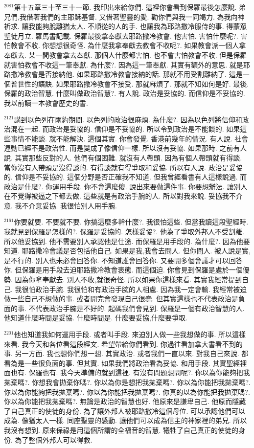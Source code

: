\documentclass{book}
\begin{document}
$^{2081}$第十五章三十至三十一節.
我印出來給你們.
這裡你會看到保羅最後怎麼說.
弟兄們,我借著我們的主耶穌基督.
又借著聖靈的愛.
勸你們與我一同竭力.
為我向神祈求.
讓我能夠脫離猶太人.
不順從的人的手.
也讓我為耶路撒冷服侍的事.
得蒙眾聖徒月立.
羅馬書記載.
保羅最後拿奉獻去耶路撒冷教會.
他害怕.
害怕什麼呢?.
害怕教會不收.
你想想很奇怪.
為什麼我拿奉獻去教會不收呢?.
如果教會派一個人拿奉獻去.
某一間教會拿去奉獻.
那個人什麼都害怕.
也不會害怕教會不收.
但是保羅就害怕教會不收這一筆奉獻.
為什麼?.
因為這一筆奉獻.
其實有額外的意思.
就是耶路撒冷教會是否接納他.
如果耶路撒冷教會接納的話.
那就不用受割離納了.
這是一個普世性的語訣.
如果耶路撒冷教會不接受.
那就麻煩了.
那就不知如何是好.
最後.
保羅的政治智慧.
什麼叫做政治智慧?.
有人說.
政治是妥協的.
而信仰是不妥協的.
我以前讀一本教會歷史的書.

$^{2121}$講到以色列在兩約期間.
以色列的政治很麻煩.
為什麼?.
因為以色列將信仰和政治混在一起.
而政治是妥協的.
信仰是不妥協的.
所以令到政治是不能談的.
如果這些事情不能談.
就不能解決.
這個其實.
你會發覺.
香港前幾年的情況.
有人說.
社會運動已經不是政治性.
而是變成了像信仰一樣.
所以沒有妥協.
如果那時.
之前有人說.
其實那些反對的人.
他們有個困難.
就沒有人帶頭.
因為有個人帶頭就有得談.
當你沒有人帶頭是沒得談的.
有得談就有得爭取和妥協.
所以有人說.
政治是妥協的.
信仰是不妥協的.
這個分野是否正確我不知道.
但我曾經看書有人這樣說過.
而政治是什麼?.
你運用手段.
你不會這麼傻.
說出來要做這件事.
你要想辦法.
讓別人在不覺得被逼之下都去做.
這些就是有政治手腕的人.
所以對我來說.
妥協我不介意.
我不介意妥協.
我很怕別人用手腕.

$^{2161}$你要就要.
不要就不要.
你搞這麼多幹什麼?.
我很怕這些.
但當我讀這段聖經時.
我就見到保羅是怎樣的?.
保羅是妥協的.
怎樣妥協?.
他為了爭取外邦人不受割離.
所以他妥協到.
他不需要別人承認他是仕途.
而保羅是用手段的.
為什麼?.
因為他要知道.
耶路撒冷會議是否包括他自己.
如果是我,我會去問人.
但你問人.
被人說是實,是不行的.
別人也未必會回答你.
不知道誰會回答你.
又要開多個會議才可以回答你.
但保羅是用手段去迫耶路撒冷教會表態.
而這個迫.
你會見到保羅是處於一個優勢.
因為你拿奉獻去.
別人不收,就很奇怪.
所以如果你這樣來看.
其實我經常提到自己.
我很怕政治手腕.
我很怕和有政治手腕的人相處.
因為我一定會輸.
我經常被迫做一些自己不想做的事.
或者開完會發現自己很蠢.
但其實這樣也不代表政治是負面的事.
不代表政治手腕是不好的.
起碼我們會見到.
保羅是一個有政治智慧的人.
他知道什麼時間是妥協.
什麼時間是.
什麼要妥協,什麼要爭取.

$^{2201}$他也知道我如何運用手段.
或者叫手段.
來迫別人做一些我想做的事.
所以這樣來看.
我今天和各位看這段經文.
希望帶給你們看到.
你過往看加拿大書看不到的事.
另一方面.
我也想你們想一想.
其實政治.
或者我們一直以來.
對我自己來說.
都看為是一些很負面的事.
但其實.
如果我們將政治看為妥協.
和用手段.
其實聖經裡面也有.
保羅也有.
我今天準備的就到這裡.
有沒有問題想問呢?.
你以為你能夠把我拋棄嗎?.
你想我會拋棄你嗎?.
你以為你是想把我拋棄嗎?.
你以為你能把我拋棄嗎?.
你以為你能夠把我拋棄嗎?.
你以為你能把我拋棄嗎?.
你真的以為你能把我拋棄嗎?.
你以為你能把我拋棄嗎?.
無論是政治的智慧也好.
他原來是謙卑自己.
他原而隱藏了自己真正的使徒的身份.
為了讓外邦人被耶路撒冷這個母位.
可以承認他們可以成為.
像猶太人一樣.
同座聖靈的感動.
讓他們可以成為信主的神家裡的弟兄.
所以我沒有想到.
原來保祿是用這個所謂的全福音的智慧.
犧牲了自己真正的使徒的身份.
為了整個外邦人可以得救.
\end{document}
